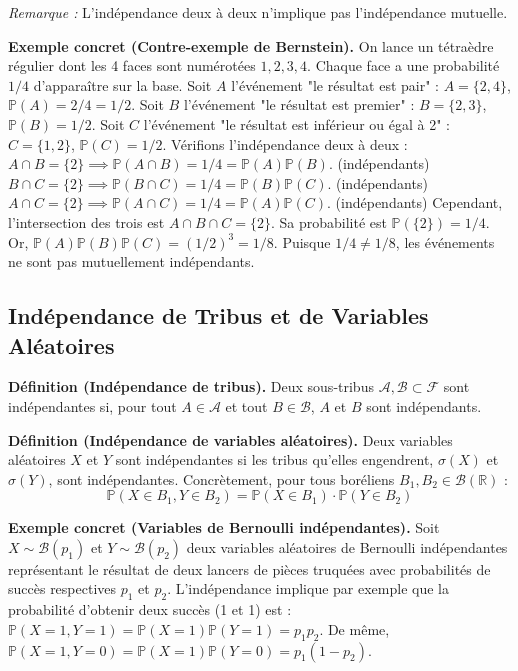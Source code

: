 \documentclass[11pt,a4paper]{article}
\begin{document}
\textit{Remarque :} L'indépendance deux à deux n'implique pas l'indépendance mutuelle.

\textbf{Exemple concret (Contre-exemple de Bernstein).}
On lance un tétraèdre régulier dont les 4 faces sont numérotées $1, 2, 3, 4$. Chaque face a une probabilité $1/4$ d'apparaître sur la base.
Soit $A$ l'événement "le résultat est pair" : $A = \{2, 4\}$, $\mathbb{P}(A) = 2/4 = 1/2$.
Soit $B$ l'événement "le résultat est premier" : $B = \{2, 3\}$, $\mathbb{P}(B) = 1/2$.
Soit $C$ l'événement "le résultat est inférieur ou égal à 2" : $C = \{1, 2\}$, $\mathbb{P}(C) = 1/2$.
Vérifions l'indépendance deux à deux :
$A \cap B = \{2\} \implies \mathbb{P}(A \cap B) = 1/4 = \mathbb{P}(A)\mathbb{P}(B)$. (indépendants)
$B \cap C = \{2\} \implies \mathbb{P}(B \cap C) = 1/4 = \mathbb{P}(B)\mathbb{P}(C)$. (indépendants)
$A \cap C = \{2\} \implies \mathbb{P}(A \cap C) = 1/4 = \mathbb{P}(A)\mathbb{P}(C)$. (indépendants)
Cependant, l'intersection des trois est $A \cap B \cap C = \{2\}$. Sa probabilité est $\mathbb{P}(\{2\}) = 1/4$.
Or, $\mathbb{P}(A)\mathbb{P}(B)\mathbb{P}(C) = (1/2)^3 = 1/8$.
Puisque $1/4 \neq 1/8$, les événements ne sont pas mutuellement indépendants.

\subsection{Indépendance de Tribus et de Variables Aléatoires}

\textbf{Définition (Indépendance de tribus).} Deux sous-tribus $\mathcal{A}, \mathcal{B} \subset \mathcal{F}$ sont indépendantes si, pour tout $A \in \mathcal{A}$ et tout $B \in \mathcal{B}$, $A$ et $B$ sont indépendants.

\textbf{Définition (Indépendance de variables aléatoires).} Deux variables aléatoires $X$ et $Y$ sont indépendantes si les tribus qu'elles engendrent, $\sigma(X)$ et $\sigma(Y)$, sont indépendantes. Concrètement, pour tous boréliens $B_1, B_2 \in \mathcal{B}(\mathbb{R})$ :
$$ \mathbb{P}(X \in B_1, Y \in B_2) = \mathbb{P}(X \in B_1) \cdot \mathbb{P}(Y \in B_2) $$

\textbf{Exemple concret (Variables de Bernoulli indépendantes).}
Soit $X \sim \mathcal{B}(p_1)$ et $Y \sim \mathcal{B}(p_2)$ deux variables aléatoires de Bernoulli indépendantes représentant le résultat de deux lancers de pièces truquées avec probabilités de succès respectives $p_1$ et $p_2$.
L'indépendance implique par exemple que la probabilité d'obtenir deux succès (1 et 1) est :
$\mathbb{P}(X = 1, Y = 1) = \mathbb{P}(X = 1)\mathbb{P}(Y = 1) = p_1 p_2$.
De même, $\mathbb{P}(X = 1, Y = 0) = \mathbb{P}(X = 1)\mathbb{P}(Y = 0) = p_1 (1 - p_2)$.
\end{document}
